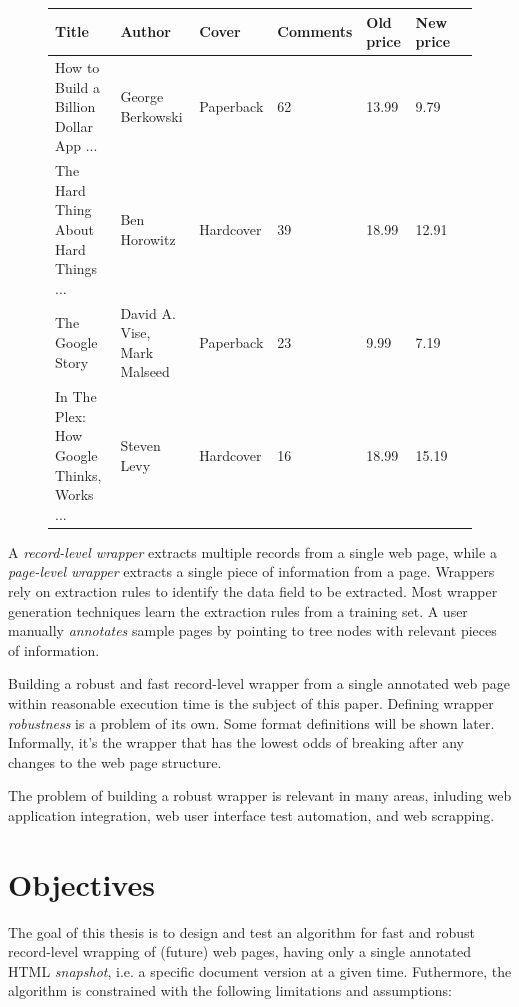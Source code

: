 \begin{figure}[h]
	\centering
    \begin{tabularx}{\textwidth}{ | l | l | l | l | l | l | p{5cm} |}
		\hline
		\textbf{Title} & \textbf{Author} & \textbf{Cover} & \textbf{Comments} & \textbf{Old price} & \textbf{New price} \\ 
		\hline
		How to Build a Billion Dollar App ... & George Berkowski & Paperback & 62 & 13.99 & 9.79 \\ 
		\hline
		The Hard Thing About Hard Things ... & Ben Horowitz & Hardcover & 39 & 18.99 & 12.91 \\ 
		\hline
		The Google Story & David A. Vise, Mark Malseed & Paperback & 23 & 9.99 & 7.19 \\ 
		\hline
		In The Plex: How Google Thinks, Works ... & Steven Levy & Hardcover & 16 & 18.99 & 15.19 \\ 
		\hline
    \end{tabularx}
\end{figure}

A \emph{record-level wrapper} extracts multiple records from a single web page, while a \emph{page-level wrapper} extracts a single piece of information from a page. Wrappers rely on extraction rules to identify the data field to be extracted. Most wrapper generation techniques learn the extraction rules from a training set. A user manually \emph{annotates} sample pages by pointing to tree nodes with relevant pieces of information.

Building a robust and fast record-level wrapper from a single annotated web page within reasonable execution time is the subject of this paper. Defining wrapper \emph{robustness} is a problem of its own. Some format definitions will be shown later. Informally, it's the wrapper that has the lowest odds of breaking after any changes to the web page structure.

The problem of building a robust wrapper is relevant in many areas, inluding web application integration, web user interface test automation, and web scrapping.


\section{Objectives}

The goal of this thesis is to design and test an algorithm for fast and robust record-level wrapping of (future) web pages, having only a single annotated HTML \emph{snapshot}, i.e. a specific document version at a given time. Futhermore, the algorithm is constrained with the following limitations and assumptions:

